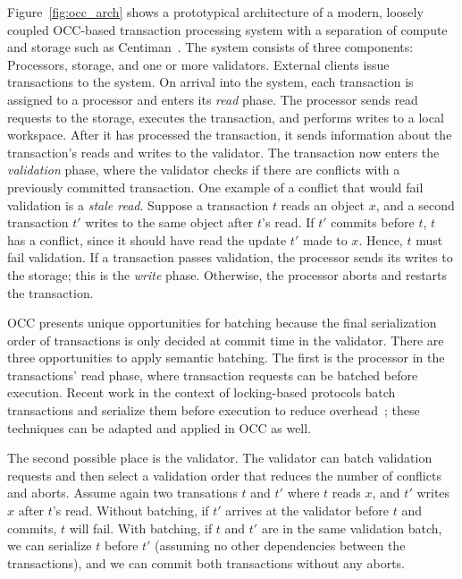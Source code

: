 Figure~\ref{fig:occ_arch} shows a prototypical architecture of a modern, loosely coupled OCC-based transaction processing system with a separation of compute and storage such as Centiman~\cite{ding2015centiman}. 
The system consists of three components: Processors, storage, and one or more validators. External clients issue transactions to the system. On arrival into the system, each transaction is assigned to a processor and enters its \emph{read} phase. The processor sends read requests to the storage, executes the transaction, and performs writes to a local workspace. After it has processed the transaction, it sends information about the transaction's reads and writes to the validator. 
The transaction now enters the \emph{validation} phase, where 
the validator checks if there are conflicts with a previously committed transaction. 
One example of a conflict that would fail validation is a \emph{stale read}. Suppose a transaction $t$ reads an object $x$, and a second transaction
$t'$ writes to the same object after $t$'s read. If $t'$ commits before $t$, $t$
has a conflict, since it should have read the update $t'$ made to $x$. Hence, $t$ must fail validation. 
If a transaction passes validation, the processor sends its writes to the storage; this is the \emph{write} phase. Otherwise, the processor aborts and restarts the transaction.

OCC 
presents unique opportunities for batching because the final serialization order of transactions is only decided at commit time in the validator. 
There are three opportunities to apply semantic batching. The first is the processor in
the transactions' read phase, where transaction requests can be batched before
execution. Recent work in the context of locking-based protocols batch transactions 
and serialize them before execution to reduce overhead~\cite{faleiro2014rethinking,mu2014extracting,thomson2012calvin}; 
these techniques can be adapted and applied in OCC as well.

The second possible place is the validator. The validator can batch validation requests and then select 
a validation order that reduces the number of conflicts and
aborts. Assume again two transations $t$ and $t'$ where $t$ reads $x$,
and $t'$ writes $x$ after $t$'s read. Without batching, if $t'$ arrives at
the validator before $t$ and commits, $t$ will fail. With
batching, if $t$ and $t'$ are in the same validation batch, 
we can serialize $t$ before $t'$ (assuming no other dependencies between the transactions), 
and we can commit both transactions without any aborts.

